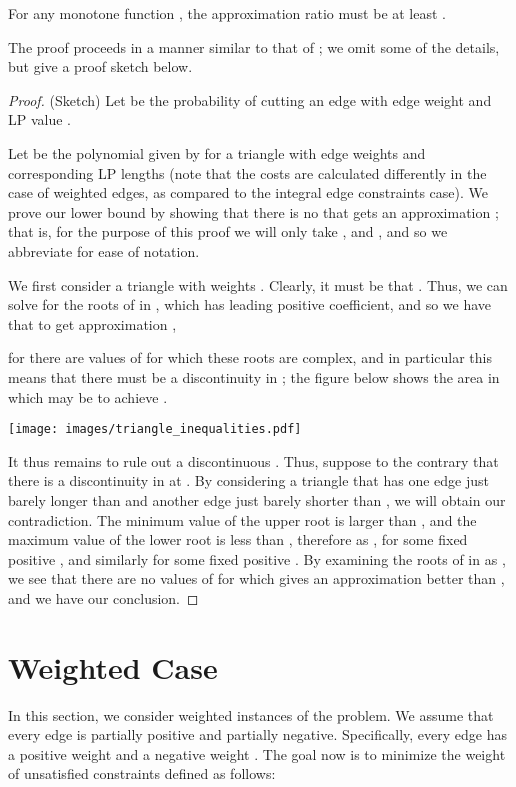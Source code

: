 \documentclass[11pt]{article}
\theoremstyle{definition}
\theoremstyle{remark}
\begin{document}
\begin{theorem}\label{thm:limitation-wti}
	For any monotone function , the approximation ratio  must be at least .
\end{theorem}

The proof proceeds in a manner similar to that of
; we omit some of the details, but give a
proof sketch below.
\begin{proof}(Sketch)
Let  be the probability of cutting an edge with edge weight  and LP
value .

Let  be the polynomial given by
 for a triangle with edge weights  and
corresponding LP lengths  (note that the costs are
calculated differently in the case of weighted edges, as compared to the
integral edge constraints case). We prove our lower bound by showing that there
is no  that gets an approximation ; that is, for the
purpose of this proof we will only take , and
, and so we abbreviate  for ease of
notation.

We first consider a triangle with weights . Clearly, it must be that
. Thus, we can solve for the roots of  in
, which has leading positive coefficient, and so we
have that to get approximation ,

for  there are values of  for which these roots are complex, and in particular this means that there must be a discontinuity in ; the figure below shows the area in which  may be to achieve .
\begin{center}
	\texttt{[image: images/triangle\_inequalities.pdf]}
\end{center}

It thus remains to rule out a discontinuous . Thus, suppose to the
contrary that there is a discontinuity in  at . By considering a
triangle that has one edge just barely longer than  and another edge just
barely shorter than , we will obtain our contradiction.  The minimum value
of the upper root is larger than , and the maximum value of the
lower root is less than , therefore as ,
 for some fixed positive ,
and similarly  for some fixed
positive . By examining the roots of  in  as , we see that there are no values
of  for which  gives an approximation better than , and we have our conclusion.
\end{proof}
 \section{Weighted Case}\label{sec:weighted}
In this section, we consider weighted instances of the problem. We assume that every
edge is partially positive and partially negative. Specifically, every edge 
has a positive weight  and a negative weight . The goal now
is to minimize the weight of unsatisfied constraints defined as follows:
\end{document}
